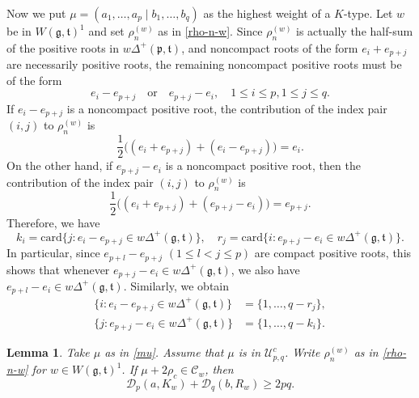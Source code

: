\documentclass[11pt]{amsart}
\theoremstyle{plain}
\newtheorem{lemma}[thm]{Lemma}
\theoremstyle{definition}
\newcommand{\frg}{\mathfrak{g}}
\newcommand{\frp}{\mathfrak{p}}
\newcommand{\frt}{\mathfrak{t}}
\newcommand{\caC}{\mathcal{C}}
\newcommand{\caD}{\mathcal{D}}
\newcommand{\caU}{\mathcal{U}}
\begin{document}
Now we put $\mu=(a_1, \dots, a_p \mid b_1, \dots, b_q)$ as the highest weight of a $K$-type. Let $w$ be in $W(\frg,\frt)^1$ and set $\rho_n^{(w)}$ as in \eqref{rho-n-w}.  Since $\rho_n^{(w)}$ is actually the half-sum of the positive roots in $w\Delta^+(\frp,\frt)$, and noncompact roots of the form $e_i+e_{p+j}$ are necessarily positive roots, the remaining noncompact positive roots must be of the form
\[e_i-e_{p+j}\quad\mbox{or}\quad e_{p+j}-e_i,\quad 1\le i\le p,1\le j\le q.\]
If $e_i-e_{p+j}$ is a noncompact positive root, the contribution of the index pair $(i,j)$ to $\rho_n^{(w)}$ is
\[\dfrac{1}{2}\big((e_i+e_{p+j})+(e_i-e_{p+j})\big)=e_i.\]
On the other hand, if $e_{p+j}-e_i$ is a noncompact positive root, then the contribution of the index pair $(i,j)$ to $\rho_n^{(w)}$ is
\[\dfrac{1}{2}\big((e_i+e_{p+j})+(e_{p+j}-e_{i})\big)=e_{p+j}.\]
Therefore, we have
\begin{equation}\label{rho_nw}
	k_i=\mathrm{card}\{j:e_i-e_{p+j}\in w\Delta^+(\frg, \frt)\},\quad r_j=\mathrm{card}\{i:e_{p+j}-e_i\in w\Delta^+(\frg, \frt)\}.
\end{equation}
In particular, since $e_{p+l}-e_{p+j}$ $(1\le l<j\le p)$ are compact positive roots, this shows that whenever $e_{p+j}-e_i\in w\Delta^+(\frg, \frt)$, we also have $e_{p+l}-e_i\in w\Delta^+(\frg, \frt)$. Similarly, we obtain
  \begin{equation}\label{rho_nw-2}
  	\begin{split}
	\{i:e_i-e_{p+j}\in w\Delta^+(\frg, \frt)\}&=\{1,\dots,q-r_j\},\\ \{j:e_{p+j}-e_i\in w\Delta^+(\frg, \frt)\}&=\{1,\dots,q-k_i\}.
	\end{split}
\end{equation}
\begin{lemma}\label{lem-large}
Take $\mu$ as in \eqref{mu}.	Assume that  $\mu$ is in $\caU_{p,q}^c$. Write
	$\rho_n^{(w)}$ as in \eqref{rho-n-w} for $w\in W(\frg,\frt)^1$.
	If $\mu+2\rho_c\in \caC_w$, then
	\begin{equation}\label{D_r-3}
		\caD_p(a,K_w)+\caD_q(b,R_w)\ge 2pq.
	\end{equation}
\end{lemma}
\end{document}
